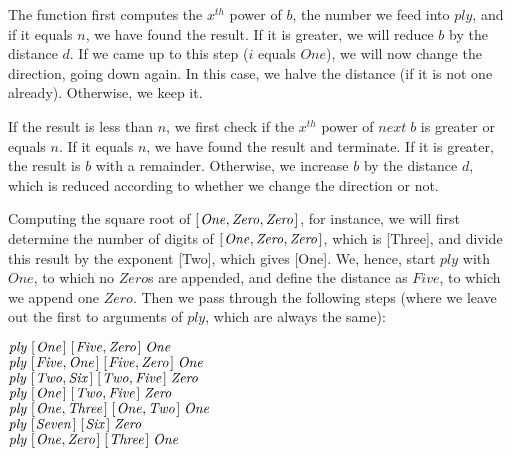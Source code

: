 \documentclass{scrreprt}
\newcommand{\Conid}[1]{\mathit{#1}}
\newcommand{\Varid}[1]{\mathit{#1}}
\begin{document}
The function first computes the $x^{th}$ power of \ensuremath{\Varid{b}},
the number we feed into \ensuremath{\Varid{ply}}, and
if it equals \ensuremath{\Varid{n}}, we have found the result.
If it is greater, we will reduce \ensuremath{\Varid{b}} by the distance \ensuremath{\Varid{d}}.
If we came up to this step (\ensuremath{\Varid{i}} equals \ensuremath{\Conid{One}}),
we will now change the direction, going down again.
In this case, we halve the distance (if it is not one already).
Otherwise, we keep it.

If the result is less than \ensuremath{\Varid{n}},
we first check if the $x^{th}$ power of \ensuremath{\Varid{next}\;\Varid{b}} 
is greater or equals \ensuremath{\Varid{n}}.
If it equals \ensuremath{\Varid{n}}, we have found the result and terminate.
If it is greater, the result is \ensuremath{\Varid{b}} with a remainder.
Otherwise, we increase \ensuremath{\Varid{b}} by the distance \ensuremath{\Varid{d}},
which is reduced according to whether we change the direction or not.

Computing the square root of \ensuremath{[\mskip1.5mu \Conid{One},\Conid{Zero},\Conid{Zero}\mskip1.5mu]}, for instance,
we will first determine the number of digits of
\ensuremath{[\mskip1.5mu \Conid{One},\Conid{Zero},\Conid{Zero}\mskip1.5mu]}, which is [Three],
and divide this result by the exponent [Two],
which gives [One].
We, hence, start \ensuremath{\Varid{ply}} with \ensuremath{\Conid{One}}, to which no \ensuremath{\Conid{Zero}}s are appended,
and define the distance as \ensuremath{\Conid{Five}}, to which we append one \ensuremath{\Conid{Zero}}.
Then we pass through the following steps 
(where we leave out the first to arguments of \ensuremath{\Varid{ply}},
which are always the same):

\ensuremath{\Varid{ply}\;[\mskip1.5mu \Conid{One}\mskip1.5mu]\;[\mskip1.5mu \Conid{Five},\Conid{Zero}\mskip1.5mu]\;\Conid{One}}\\
\ensuremath{\Varid{ply}\;[\mskip1.5mu \Conid{Five},\Conid{One}\mskip1.5mu]\;[\mskip1.5mu \Conid{Five},\Conid{Zero}\mskip1.5mu]\;\Conid{One}}\\
\ensuremath{\Varid{ply}\;[\mskip1.5mu \Conid{Two},\Conid{Six}\mskip1.5mu]\;[\mskip1.5mu \Conid{Two},\Conid{Five}\mskip1.5mu]\;\Conid{Zero}}\\ 
\ensuremath{\Varid{ply}\;[\mskip1.5mu \Conid{One}\mskip1.5mu]\;[\mskip1.5mu \Conid{Two},\Conid{Five}\mskip1.5mu]\;\Conid{Zero}}\\
\ensuremath{\Varid{ply}\;[\mskip1.5mu \Conid{One},\Conid{Three}\mskip1.5mu]\;[\mskip1.5mu \Conid{One},\Conid{Two}\mskip1.5mu]\;\Conid{One}}\\
\ensuremath{\Varid{ply}\;[\mskip1.5mu \Conid{Seven}\mskip1.5mu]\;[\mskip1.5mu \Conid{Six}\mskip1.5mu]\;\Conid{Zero}}\\
\ensuremath{\Varid{ply}\;[\mskip1.5mu \Conid{One},\Conid{Zero}\mskip1.5mu]\;[\mskip1.5mu \Conid{Three}\mskip1.5mu]\;\Conid{One}}
\end{document}

